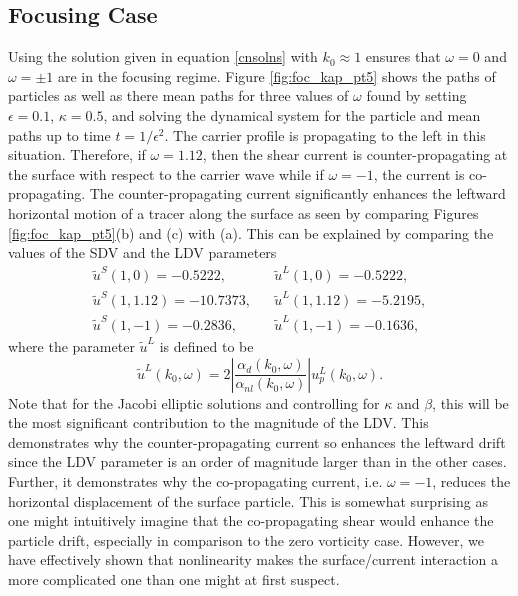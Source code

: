 \documentclass{JFM_Style/jfm}
\begin{document}
\subsection{Focusing Case}

Using the solution given in equation \eqref{cnsolns} with $k_0\approx1$ ensures that $\omega = 0$ and $\omega=\pm 1$ are in the focusing regime.   Figure \ref{fig:foc_kap_pt5} shows the paths of particles as well as there mean paths for three values of $\omega$ found by setting $\epsilon=0.1$, $\kappa=0.5$, and solving the dynamical system for the particle and mean paths up to time $t=1/\epsilon^{2}$.  The carrier profile is propagating to the left in this situation.  Therefore, if $\omega=1.12$, then the shear current is counter-propagating at the surface with respect to the carrier wave while if $\omega=-1$, the current is co-propagating.  The counter-propagating current significantly enhances the leftward horizontal motion of a tracer along the surface as seen by comparing Figures \ref{fig:foc_kap_pt5}(b) and (c) with (a).  This can be explained by comparing the values of the SDV and the LDV parameters
\[
\begin{array}{lcl}
\tilde{u}^{S}(1,0) = -0.5222, & & \tilde{u}^{L}(1,0) = -0.5222,\\
\tilde{u}^{S}(1,1.12) = -10.7373,& & \tilde{u}^{L}(1,1.12) = -5.2195,\\
\tilde{u}^{S}(1,-1) = -0.2836, & & \tilde{u}^{L}(1,-1) = -0.1636,
\end{array}
\]
where the parameter $\tilde{u}^{L}$ is defined to be
\[
\tilde{u}^{L}(k_{0},\omega) = 2\left|\frac{\alpha_{d}(k_{0},\omega)}{\alpha_{nl}(k_{0},\omega)}\right|u^{L}_{p}(k_{0},\omega).
\]
Note that for the Jacobi elliptic solutions and controlling for $\kappa$ and $\beta$, this will be the most significant contribution to the magnitude of the LDV.  This demonstrates why the counter-propagating current so enhances the leftward drift since the LDV parameter is an order of magnitude larger than in the other cases.    Further, it demonstrates why the co-propagating current, i.e. $\omega=-1$, reduces the horizontal displacement of the surface particle.  This is somewhat surprising as one might intuitively imagine that the co-propagating shear would enhance the particle drift, especially in comparison to the zero vorticity case.  However, we have effectively shown that nonlinearity makes the surface/current interaction a more complicated one than one might at first suspect.
\end{document}

